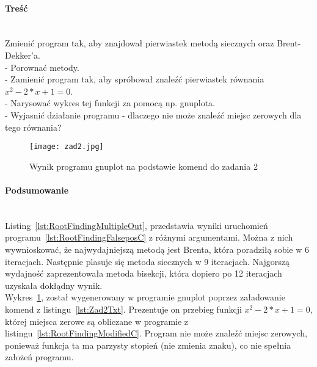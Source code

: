 \paragraph{Treść}~\\
Zmienić program tak, aby znajdował pierwiastek metodą siecznych oraz Brent-Dekker'a.\\
- Porownać metody.\\
- Zamienić program tak, aby spróbował znaleźć pierwiastek równania $ x^2 - 2*x + 1 = 0 $.\\
- Narysować wykres tej funkcji za pomocą np. gnuplota.\\
- Wyjasnić działanie programu - dlaczego nie może znaleźć miejsc zerowych dla tego równania?









\begin{figure}[p]
  \caption{Wynik programu gnuplot na podstawie komend do zadania 2}
  \label{fig:Zad2Jpg}
  \centering
  \texttt{[image: zad2.jpg]}
\end{figure}

\paragraph{Podsumowanie}~\\
Listing~\ref{lst:RootFindingMultipleOut}, przedstawia wyniki uruchomień programu~\ref{lst:RootFindingFalseposC} z różnymi argumentami.
Można z nich wywnioskować, że najwydajniejszą metodą jest Brenta, która poradziłą sobie w 6 iteracjach.
Następnie plasuje się metoda siecznych w 9 iteracjach.
Najgorszą wydajność zaprezentowała metoda bisekcji, która dopiero po 12 iteracjach uzyskała dokłądny wynik.\\
Wykres~\ref{fig:Zad2Jpg}, został wygenerowany w programie gnuplot poprzez załadowanie komend z listingu~\ref{lst:Zad2Txt}.
Prezentuje on przebieg funkcji $ x^2 - 2*x + 1 = 0 $, której miejsca zerowe są obliczane w programie z listingu~\ref{lst:RootFindingModifiedC}.
Program nie może znaleźć miejsc zerowych, ponieważ funkcja ta ma parzysty stopień (nie zmienia znaku), co nie spełnia założeń programu.
